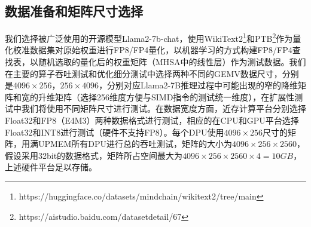 
\subsection{数据准备和矩阵尺寸选择}
我们选择被广泛使用的开源模型Llama2-7b-chat，使用WikiText2\footnote{https://huggingface.co/datasets/mindchain/wikitext2/tree/main}和PTB\footnote{https://aistudio.baidu.com/datasetdetail/67}作为量化校准数据集对原始权重进行FP8/FP4量化，以机器学习的方式构建FP8/FP4查找表，以随机选取的量化后的权重矩阵（MHSA中的线性层）作为测试数据。我们在主要的算子吞吐测试和优化细分测试中选择两种不同的GEMV数据尺寸，分别是$4096\times 256$，$256\times 4096$，分别对应Llama2-7B推理过程中可能出现的窄的降维矩阵和宽的升维矩阵（选择256维度方便与SIMD指令的测试统一维度），在扩展性测试中我们将使用不同矩阵尺寸进行测试。在数据宽度方面，近存计算平台分别选择Float32和FP8（E4M3）两种数据格式进行测试，相应的在CPU和GPU平台选择Float32和INT8进行测试（硬件不支持FP8）。每个DPU使用$4096\times 256$尺寸的矩阵，用满UPMEM所有DPU进行总的吞吐测试，矩阵的大小为$4096\times 256\times 2560$，假设采用32bit的数据格式，矩阵所占空间最大为$4096\times 256\times 2560\times 4=10GB$，上述硬件平台足以存储。


